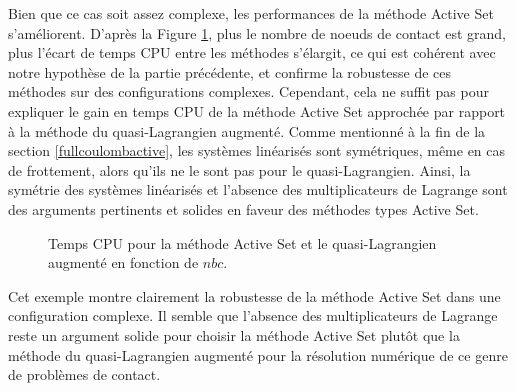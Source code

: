 Bien que ce cas soit assez complexe, les performances de la méthode Active Set s'améliorent. D'après la Figure \ref{dynahyper_CPU}, plus le nombre de noeuds de contact est grand, plus l'écart de temps CPU entre les méthodes s'élargit, ce qui est cohérent avec notre hypothèse de la partie précédente, et confirme la robustesse de ces méthodes sur des configurations complexes. Cependant, cela ne suffit pas pour expliquer le gain en temps CPU de la méthode Active Set approchée par rapport à la méthode du quasi-Lagrangien augmenté. Comme mentionné à la fin de la section \ref{fullcoulombactive}, les systèmes linéarisés sont symétriques, même en cas de frottement, alors qu'ils ne le sont pas pour le quasi-Lagrangien. Ainsi, la symétrie des systèmes linéarisés et l'absence des multiplicateurs de Lagrange sont des arguments pertinents et solides en faveur des méthodes types Active Set. 

\begin{figure}[h!]
	\begin{center}
	\end{center}
	\caption{Temps CPU pour la méthode Active Set et le quasi-Lagrangien augmenté en fonction de $nbc$.}
	\label{dynahyper_CPU}
\end{figure}

Cet exemple montre clairement la robustesse de la méthode Active Set dans une configuration complexe. Il semble que l'absence des multiplicateurs de Lagrange reste un argument solide pour choisir la méthode Active Set plutôt que la méthode du quasi-Lagrangien augmenté pour la résolution numérique de ce genre de problèmes de contact.




